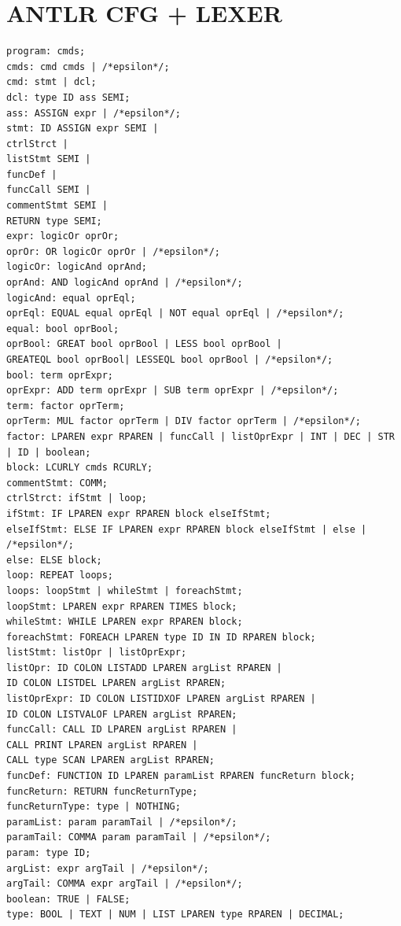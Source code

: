 \chapter{ANTLR CFG + LEXER}
\begin{lstlisting}[language=scriptkid, label={list:ANTLRCFG},caption=Context-free grammar for \lang used in ANTLR]
    program: cmds;  
cmds: cmd cmds | /*epsilon*/;  
cmd: stmt | dcl;  
dcl: type ID ass SEMI;  
ass: ASSIGN expr | /*epsilon*/;   
stmt: ID ASSIGN expr SEMI |  
ctrlStrct |  
listStmt SEMI | 
funcDef | 
funcCall SEMI | 
commentStmt SEMI | 
RETURN type SEMI;   
expr: logicOr oprOr;  
oprOr: OR logicOr oprOr | /*epsilon*/;  
logicOr: logicAnd oprAnd;  
oprAnd: AND logicAnd oprAnd | /*epsilon*/;  
logicAnd: equal oprEql;  
oprEql: EQUAL equal oprEql | NOT equal oprEql | /*epsilon*/;  
equal: bool oprBool;  
oprBool: GREAT bool oprBool | LESS bool oprBool |   
GREATEQL bool oprBool| LESSEQL bool oprBool | /*epsilon*/;  
bool: term oprExpr;  
oprExpr: ADD term oprExpr | SUB term oprExpr | /*epsilon*/;  
term: factor oprTerm; 
oprTerm: MUL factor oprTerm | DIV factor oprTerm | /*epsilon*/;  
factor: LPAREN expr RPAREN | funcCall | listOprExpr | INT | DEC | STR | ID | boolean;  
block: LCURLY cmds RCURLY;  
commentStmt: COMM; 
ctrlStrct: ifStmt | loop; 
ifStmt: IF LPAREN expr RPAREN block elseIfStmt;  
elseIfStmt: ELSE IF LPAREN expr RPAREN block elseIfStmt | else |  
/*epsilon*/;  
else: ELSE block;   
loop: REPEAT loops; 
loops: loopStmt | whileStmt | foreachStmt; 
loopStmt: LPAREN expr RPAREN TIMES block; 
whileStmt: WHILE LPAREN expr RPAREN block; 
foreachStmt: FOREACH LPAREN type ID IN ID RPAREN block; 
listStmt: listOpr | listOprExpr; 
listOpr: ID COLON LISTADD LPAREN argList RPAREN |  
ID COLON LISTDEL LPAREN argList RPAREN; 
listOprExpr: ID COLON LISTIDXOF LPAREN argList RPAREN |  
ID COLON LISTVALOF LPAREN argList RPAREN; 
funcCall: CALL ID LPAREN argList RPAREN |  
CALL PRINT LPAREN argList RPAREN |  
CALL type SCAN LPAREN argList RPAREN; 
funcDef: FUNCTION ID LPAREN paramList RPAREN funcReturn block; 
funcReturn: RETURN funcReturnType; 
funcReturnType: type | NOTHING; 
paramList: param paramTail | /*epsilon*/; 
paramTail: COMMA param paramTail | /*epsilon*/; 
param: type ID; 
argList: expr argTail | /*epsilon*/; 
argTail: COMMA expr argTail | /*epsilon*/; 
boolean: TRUE | FALSE;  
type: BOOL | TEXT | NUM | LIST LPAREN type RPAREN | DECIMAL; 
\end{lstlisting}



